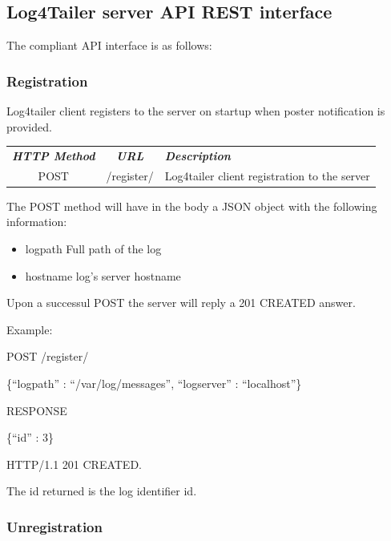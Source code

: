 \subsection{Log4Tailer server API REST interface}

The compliant API interface is as follows:

\subsubsection{Registration}

Log4tailer client registers to the server on startup when poster notification
is provided.

\begin{flushleft}
 \begin{tabular}{|c|c|l|}
 \hline 
 \rowcolor{cyan} {\color{white} \textit{\textbf{HTTP Method}}} &  {\color{white} 
  \textit{\textbf{URL}}}  & {\color{white} 
 \textit{\textbf{Description}}}\\
 POST & /register/ & Log4tailer client registration to the server\\
 \hline
\end{tabular}
\end{flushleft}
The POST method will have in the body a JSON object with the following
information:

\begin{itemize}
 \item logpath Full path of the log 
 \item hostname log's server hostname
\end{itemize}

\noindent
Upon a successul POST the server will reply a 201 CREATED answer.

\noindent
Example:

\begin{codeexample}

POST /register/

 \{``logpath'' : ``/var/log/messages'', ``logserver'' : ``localhost''\} 

RESPONSE

 \{``id'' : 3\} 

HTTP/1.1 201 CREATED.
\end{codeexample}

The id returned is the log identifier id.

\subsubsection{Unregistration}

